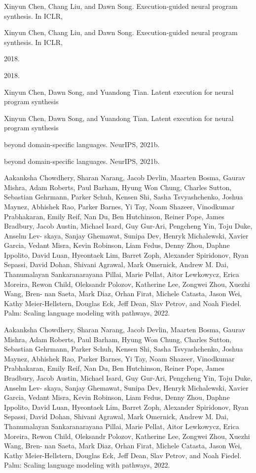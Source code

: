 \documentclass[12pt]{article}
\begin{document}
Xinyun Chen, Chang Liu, and Dawn Song. Execution-guided neural program synthesis. In ICLR,


Xinyun Chen, Chang Liu, and Dawn Song. Execution-guided neural program synthesis. In ICLR,


2018.


2018.


Xinyun Chen, Dawn Song, and Yuandong Tian. Latent execution for neural program synthesis


Xinyun Chen, Dawn Song, and Yuandong Tian. Latent execution for neural program synthesis


beyond domain-specific languages. NeurIPS, 2021b.


beyond domain-specific languages. NeurIPS, 2021b.


Aakanksha Chowdhery, Sharan Narang, Jacob Devlin, Maarten Bosma, Gaurav Mishra, Adam
Roberts, Paul Barham, Hyung Won Chung, Charles Sutton, Sebastian Gehrmann, Parker Schuh,
Kensen Shi, Sasha Tsvyashchenko, Joshua Maynez, Abhishek Rao, Parker Barnes, Yi Tay, Noam
Shazeer, Vinodkumar Prabhakaran, Emily Reif, Nan Du, Ben Hutchinson, Reiner Pope, James
Bradbury, Jacob Austin, Michael Isard, Guy Gur-Ari, Pengcheng Yin, Toju Duke, Anselm Lev-
skaya, Sanjay Ghemawat, Sunipa Dev, Henryk Michalewski, Xavier Garcia, Vedant Misra, Kevin
Robinson, Liam Fedus, Denny Zhou, Daphne Ippolito, David Luan, Hyeontaek Lim, Barret
Zoph, Alexander Spiridonov, Ryan Sepassi, David Dohan, Shivani Agrawal, Mark Omernick,
Andrew M. Dai, Thanumalayan Sankaranarayana Pillai, Marie Pellat, Aitor Lewkowycz, Erica
Moreira, Rewon Child, Oleksandr Polozov, Katherine Lee, Zongwei Zhou, Xuezhi Wang, Bren-
nan Saeta, Mark Diaz, Orhan Firat, Michele Catasta, Jason Wei, Kathy Meier-Hellstern, Douglas
Eck, Jeff Dean, Slav Petrov, and Noah Fiedel. Palm: Scaling language modeling with pathways,
2022.


Aakanksha Chowdhery, Sharan Narang, Jacob Devlin, Maarten Bosma, Gaurav Mishra, Adam
Roberts, Paul Barham, Hyung Won Chung, Charles Sutton, Sebastian Gehrmann, Parker Schuh,
Kensen Shi, Sasha Tsvyashchenko, Joshua Maynez, Abhishek Rao, Parker Barnes, Yi Tay, Noam
Shazeer, Vinodkumar Prabhakaran, Emily Reif, Nan Du, Ben Hutchinson, Reiner Pope, James
Bradbury, Jacob Austin, Michael Isard, Guy Gur-Ari, Pengcheng Yin, Toju Duke, Anselm Lev-
skaya, Sanjay Ghemawat, Sunipa Dev, Henryk Michalewski, Xavier Garcia, Vedant Misra, Kevin
Robinson, Liam Fedus, Denny Zhou, Daphne Ippolito, David Luan, Hyeontaek Lim, Barret
Zoph, Alexander Spiridonov, Ryan Sepassi, David Dohan, Shivani Agrawal, Mark Omernick,
Andrew M. Dai, Thanumalayan Sankaranarayana Pillai, Marie Pellat, Aitor Lewkowycz, Erica
Moreira, Rewon Child, Oleksandr Polozov, Katherine Lee, Zongwei Zhou, Xuezhi Wang, Bren-
nan Saeta, Mark Diaz, Orhan Firat, Michele Catasta, Jason Wei, Kathy Meier-Hellstern, Douglas
Eck, Jeff Dean, Slav Petrov, and Noah Fiedel. Palm: Scaling language modeling with pathways,
2022.
\end{document}
